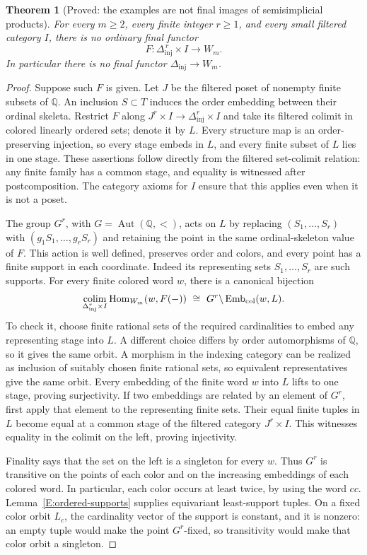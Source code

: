 \documentclass[11pt,a4paper]{article}
\newcommand{\colim}{\operatorname*{colim}}
\newcommand{\Hom}{\operatorname{Hom}}
\newcommand{\Dinj}{\Delta_{\mathrm{inj}}}
\newtheorem{theorem}{Theorem}[section]
\theoremstyle{definition}
\begin{document}
\begin{theorem}[Proved: the examples are not final images of semisimplicial products]\label{E:not-final-image}
For every $m\geq2$, every finite integer $r\geq1$, and every
small filtered category $I$, there is no ordinary final functor
\[
F:\Dinj^{\,r}\times I\longrightarrow W_m.
\]
In particular there is no final functor $\Dinj\to W_m$.
\end{theorem}
\begin{proof}
Suppose such $F$ is given. Let $J$ be the filtered poset of
nonempty finite subsets of $\mathbb Q$. An inclusion $S\subset T$
induces the order embedding between their ordinal skeleta.
Restrict $F$ along $J^r\times I\to\Dinj^r\times I$ and take
its filtered colimit in colored linearly ordered sets; denote it
by $L$. Every structure map is an order-preserving injection,
so every stage embeds in $L$, and every finite subset of $L$
lies in one stage. These assertions follow directly from the
filtered set-colimit relation: any finite family has a common
stage, and equality is witnessed after postcomposition. The
category axioms for $I$ ensure that this applies even when it is
not a poset.

The group $G^r$, with $G=\operatorname{Aut}(\mathbb Q,<)$,
acts on $L$ by replacing $(S_1,\ldots,S_r)$ with
$(g_1S_1,\ldots,g_rS_r)$ and retaining the point in the same
ordinal-skeleton value of $F$. This action is well defined,
preserves order and colors, and every point has a finite support
in each coordinate. Indeed its representing sets $S_1,\ldots,S_r$
are such supports.
For every finite colored word $w$, there is a canonical bijection
\[
\colim_{\Dinj^r\times I}\Hom_{W_m}(w,F(-))
\ \cong\ G^r\backslash\operatorname{Emb}_{\rm col}(w,L).
\]
To check it, choose finite rational sets of the required
cardinalities to embed any representing stage into $L$. A
different choice differs by order automorphisms of $\mathbb Q$,
so it gives the same orbit. A morphism in the indexing category
can be realized as inclusion of suitably chosen finite rational
sets, so equivalent representatives give the same orbit. Every
embedding of the finite word $w$ into $L$ lifts to one stage,
proving surjectivity. If two embeddings are related by an element
of $G^r$, first apply that element to the representing finite
sets. Their equal finite tuples in $L$ become equal at a common
stage of the filtered category $J^r\times I$. This witnesses
equality in the colimit on the left, proving injectivity.

Finality says that the set on the left is a singleton for every
$w$. Thus $G^r$ is transitive on the points of each color and on
the increasing embeddings of each colored word. In particular,
each color occurs at least twice, by using the word $cc$.
Lemma~\ref{E:ordered-supports} supplies equivariant least-support
tuples. On a fixed color orbit $L_c$, the cardinality vector of
the support is constant, and it is nonzero: an empty tuple would
make the point $G^r$-fixed, so transitivity would make that color
orbit a singleton.


\end{proof}
\end{document}
